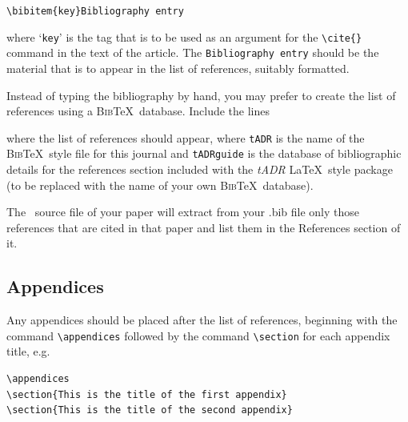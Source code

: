 \documentclass{tADR2e}
\begin{document}
\noindent\verb"\bibitem{key}Bibliography entry"
\vspace{12pt}

\noindent where `{\tt key}' is the tag that is to be used as an argument for the \verb"\cite{}" command in the text of the article. The {\tt Bibliography entry} should be the material that is to appear in the list of references, suitably formatted.

Instead of typing the bibliography by hand, you may prefer to create the list of references using a \textsc{Bib}\TeX\ database. Include the lines \vspace{12pt}

\noindent\verb""
\newline\verb""
\vspace{12pt}

\noindent where the list of references should appear, where \texttt{tADR} is the name of the \textsc{Bib}\TeX\ style file for this journal and \texttt{tADRguide} is the database of bibliographic details for the references section included with the {\itshape tADR} \LaTeX\ style package (to be replaced with the name of your own \textsc{Bib}\TeX\ database).

The \LaTeXe\ source file of your paper will extract from your .bib file only those references that are cited in that paper and list them in the References section of it.


\subsection{Appendices}\label{appendices}

Any appendices should be placed after the list of references, beginning with the
command \verb"\appendices" followed by the command \verb"\section"
for each appendix title, e.g.
%
\begin{verbatim}
\appendices
\section{This is the title of the first appendix}
\section{This is the title of the second appendix}
\end{verbatim}
\end{document}
